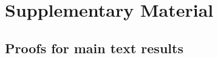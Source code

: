 \documentclass[11pt,a4paper]{article}
\theoremstyle{definition}
\theoremstyle{remark}
\begin{document}
\appendix
\renewcommand{\thesection}{S}
\renewcommand{\thesubsection}{S.\arabic{subsection}}
\renewcommand{\thesubsubsection}{S.\arabic{subsection}.\arabic{subsubsection}}
\renewcommand{\thefigure}{S.\arabic{figure}}
\renewcommand{\thetable}{S.\arabic{table}}
\renewcommand{\theHsection}{S}
\renewcommand{\theHsubsection}{S.\arabic{subsection}}
\renewcommand{\theHsubsubsection}{S.\arabic{subsection}.\arabic{subsubsection}}
\renewcommand{\theHfigure}{S.\arabic{figure}}
\renewcommand{\theHtable}{S.\arabic{table}}
\setcounter{figure}{0}
\setcounter{table}{0}

\section{Supplementary Material}

\subsection{Proofs for main text results}\label{appendix:main-text-proofs}
\end{document}
